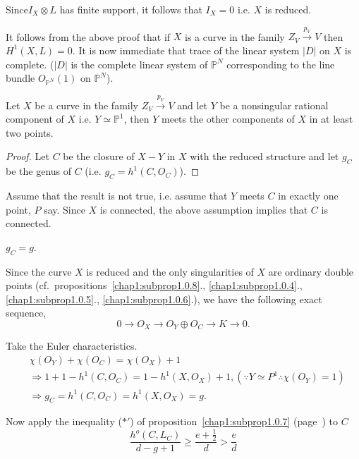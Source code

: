 {\noindent
Since\pageoriginale $I_X \otimes L$ has finite support, it follows
that $I_X = 0$ i.e. $X$ is reduced.   

It follows from the above proof that if $X$ is a curve in the family
$Z_V \xrightarrow{p_V} V$ then $H^1 (X, L) = 0$. It is now immediate
that trace of the linear system $|D|$ on $X$ is complete. ($|D|$ is
the complete linear system of $\mathbb{P}^N$ corresponding to the line
bundle $O_{\mathbb{P}^N} (1)$ on $\mathbb{P}^N$). 

\begin{subprop}\label{chap1:subprop1.0.9}%
Let $X$ be a curve in the family $Z_V \xrightarrow{p_V}V$ and let $Y$
be a nonsingular rational component of $X$ i.e. $Y \simeq
\mathbb{P}^{1}$, then $Y$ meets the other components of $X$ in at
least two points. 
\end{subprop}

\begin{proof}
Let $C$ be the closure of $X-Y$ in $X$ with the reduced structure and
let $g_C$ be the genus of $C$ (i.e. $g_C = h^1 (C, O_C)$). 
\end{proof}

Assume that the result is not true, i.e. assume that $Y$ meets $C$ in
exactly one point, $P$ say. Since $X$ is connected, the above
assumption implies that $C$ is connected. 

\medskip
{}
$g_C = g$.

\medskip
{}
Since the curve $X$ is reduced and the only singularities of $X$ are
ordinary double points (cf.\ propositions~\ref{chap1:subprop1.0.8}.,
\ref{chap1:subprop1.0.4}., \ref{chap1:subprop1.0.5}., 
\ref{chap1:subprop1.0.6}.), we have the following exact sequence, 
$$
0 \to  O_X \to O_Y \oplus O_C \to  K \to 0.
$$ 

\noindent 
Take the Euler characteristics.
\begin{align*}
& \chi (O_Y) + \chi (O_C) = \chi (O_X) + 1\\ 
&\Longrightarrow 1 + 1 - h^1 (C, O_C) = 1 - h^{1} (X, O_X) +1,
  (\because Y \simeq P^1 \therefore \chi (O_Y) = 1) \\
& \Rightarrow g_C = h^1 (C,O_C) = h^1 (X, O_X)= g.
\end{align*}\pageoriginale

Now apply the inequality ($*'$) of proposition~\ref{chap1:subprop1.0.7} 
(page~\pageref{chap1:subprop1.0.7}) 
to $C$  
$$
\frac{h^o (C,L_C)}{d-g+1} \geq \frac{e + \frac{1}{2}}{d} >
\frac{e}{d} 
$$

}

